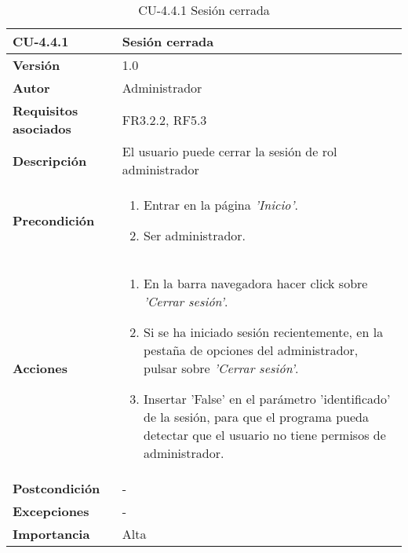\begin{table}[h!]
	\centering
	\begin{tabularx}{\linewidth}{ p{} p{} }
		\toprule
		\textbf{CU-4.4.1}    & \textbf{Sesión cerrada}\\
		\toprule
		\textbf{Versión}              & 1.0    \\
		\textbf{Autor}                & Administrador \\
		\textbf{Requisitos asociados} & FR3.2.2, RF5.3\\
		\textbf{Descripción}          & El usuario puede cerrar la sesión de rol administrador\\
        \textbf{Precondición}         &  
  		\begin{enumerate}
			\def\labelenumi{\arabic{enumi}.}
			\tightlist
			\item Entrar en la página \textit{'Inicio'}.
                \item Ser administrador.
		\end{enumerate}\\
		\textbf{Acciones}             &
		\begin{enumerate}
			\def\labelenumi{\arabic{enumi}.}
			\tightlist
			\item En la barra navegadora hacer click sobre \textit{'Cerrar sesión'}.
            \item Si se ha iniciado sesión recientemente, en la pestaña de opciones del administrador, pulsar sobre \textit{'Cerrar sesión'}.
            \item Insertar 'False' en el parámetro 'identificado' de la sesión, para que el programa pueda detectar que el usuario no tiene permisos de administrador.
		\end{enumerate}\\
		\textbf{Postcondición}     &   - \\
		\textbf{Excepciones}          &  - \\
		\textbf{Importancia}          & Alta \\
		\bottomrule
	\end{tabularx}
	\caption{CU-4.4.1 Sesión cerrada}
\end{table}
 